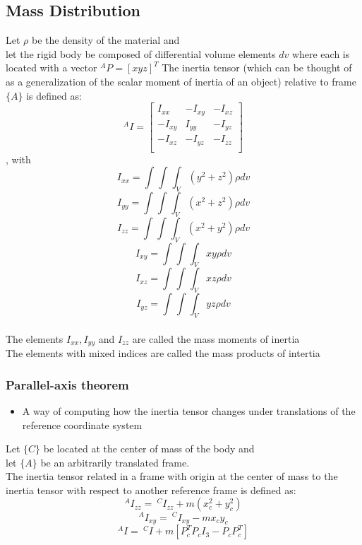 \documentclass[10pt,a4paper]{article}
\begin{document}
\subsection{Mass Distribution}
Let $\rho$ be the density of the material and \\
let the rigid body be composed of differential volume elements $dv$ where each is located with a vector $^AP = [xyz]^T$
The inertia tensor (which can be thought of as a generalization of the scalar moment of inertia of an object) relative to frame $\{A\}$ is defined as:
$$
	^AI = \begin{bmatrix}
		I_{xx} & -I_{xy} & -I_{xz} \\
		-I_{xy} & I_{yy} & -I_{yz} \\
		-I_{xz} & -I_{yz} & -I_{zz} \\
	\end{bmatrix}
$$
, with
$$
	I_{xx} = \int_{} \int_{} \int_V (y^2 + z^2) \rho dv
$$
$$
	I_{yy} = \int_{} \int_{} \int_V (x^2 + z^2) \rho dv
$$
$$
	I_{zz} = \int_{} \int_{} \int_V (x^2 + y^2) \rho dv
$$
$$
	I_{xy} = \int_{} \int_{} \int_V xy \rho dv
$$
$$
	I_{xz} = \int_{} \int_{} \int_V xz \rho dv
$$
$$
	I_{yz} = \int_{} \int_{} \int_V yz \rho dv
$$
\\
The elements $I_{xx}, I_{yy}$ and $I_{zz}$ are called the mass moments of inertia \\
The elements with mixed indices are called the mass products of intertia

\subsubsection{Parallel-axis theorem}
\begin{itemize}
	\item A way of computing how the inertia tensor changes under translations of the reference coordinate system
\end{itemize}

Let $\{C\}$ be located at the center of mass of the body and \\
let $\{A\}$ be an arbitrarily translated frame. \\
The inertia tensor related in a frame with origin at the center of mass to the inertia tensor with respect to another reference frame is defined as:
$$
	^AI_{zz} = ~^CI_{zz} + m(x_c^2 + y_c^2)
$$
$$
	^AI_{xy} = ~^CI_{xy} - mx_cy_c
$$
$$
	^AI = ~^CI + m[P_c^TP_cI_3 - P_cP_c^T]
$$
\end{document}
